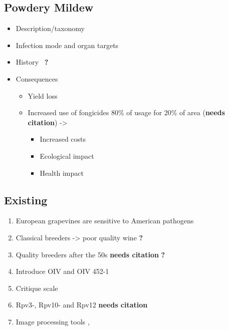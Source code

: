 \documentclass[english]{article}
\begin{document}
\subsection{Powdery Mildew}

\begin{itemize}
	\item Description/taxonomy
	\item Infection mode and organ targets
	\item History~\parencite*{fontaineEuropeBridgeheadWorldwide2021} \textbf{?}
	\item Consequences
	      \begin{itemize}
		      \item Yield loss
		      \item Increased use of fongicides 80\% of usage for 20\% of area (\textbf{needs citation}) ->
		            \begin{itemize}
			            \item Increased costs
			            \item Ecological impact
			            \item Health impact
		            \end{itemize}
	      \end{itemize}
\end{itemize}

\subsection{Existing}

\begin{enumerate}
	\item European grapevines are sensitive to American pathogens~\parencite*{fontaineEuropeBridgeheadWorldwide2021}
	\item Classical breeders -> poor quality wine \textbf{?}
	\item Quality breeders after the 50s \textbf{needs citation} \textbf{?}
	\item Introduce OIV and OIV 452-1
	\item Critique scale \parencite{possamaiPhenotypingQTLIdentification2022}
	\item Rpv3-, Rpv10- and Rpv12 \textbf{needs citation}
	\item Image processing tools \parencite{hernandezAssessmentDownyMildew2022}, \parencite{zendlerHighthroughputPhenotypingLeaf2021}
\end{enumerate}
\end{document}
